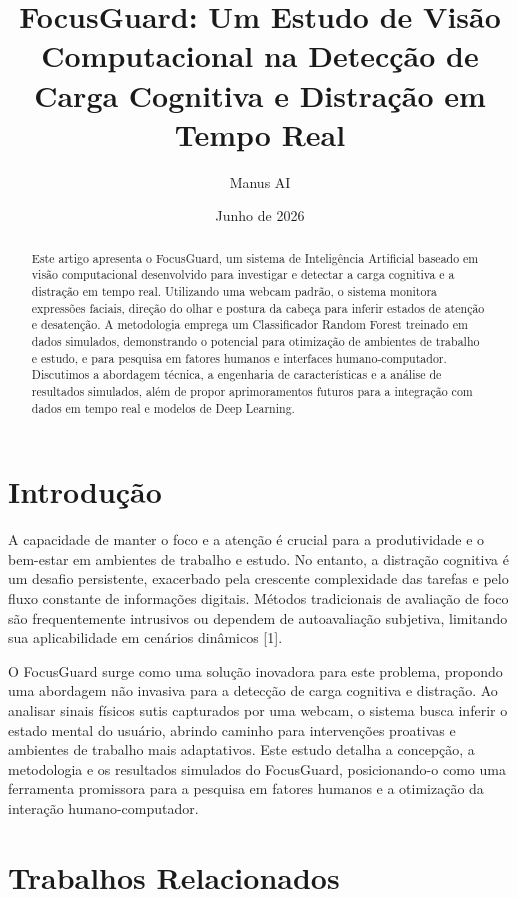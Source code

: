 \documentclass{article}
\title{FocusGuard: Um Estudo de Visão Computacional na Detecção de Carga Cognitiva e Distração em Tempo Real}
\author{Manus AI}
\date{Junho de 2026}
\begin{document}
\maketitle

\begin{abstract}
Este artigo apresenta o FocusGuard, um sistema de Inteligência Artificial baseado em visão computacional desenvolvido para investigar e detectar a carga cognitiva e a distração em tempo real. Utilizando uma webcam padrão, o sistema monitora expressões faciais, direção do olhar e postura da cabeça para inferir estados de atenção e desatenção. A metodologia emprega um Classificador Random Forest treinado em dados simulados, demonstrando o potencial para otimização de ambientes de trabalho e estudo, e para pesquisa em fatores humanos e interfaces humano-computador. Discutimos a abordagem técnica, a engenharia de características e a análise de resultados simulados, além de propor aprimoramentos futuros para a integração com dados em tempo real e modelos de Deep Learning.
\end{abstract}

\section{Introdução}

A capacidade de manter o foco e a atenção é crucial para a produtividade e o bem-estar em ambientes de trabalho e estudo. No entanto, a distração cognitiva é um desafio persistente, exacerbado pela crescente complexidade das tarefas e pelo fluxo constante de informações digitais. Métodos tradicionais de avaliação de foco são frequentemente intrusivos ou dependem de autoavaliação subjetiva, limitando sua aplicabilidade em cenários dinâmicos [1].

O FocusGuard surge como uma solução inovadora para este problema, propondo uma abordagem não invasiva para a detecção de carga cognitiva e distração. Ao analisar sinais físicos sutis capturados por uma webcam, o sistema busca inferir o estado mental do usuário, abrindo caminho para intervenções proativas e ambientes de trabalho mais adaptativos. Este estudo detalha a concepção, a metodologia e os resultados simulados do FocusGuard, posicionando-o como uma ferramenta promissora para a pesquisa em fatores humanos e a otimização da interação humano-computador.

\section{Trabalhos Relacionados}
\end{document}

